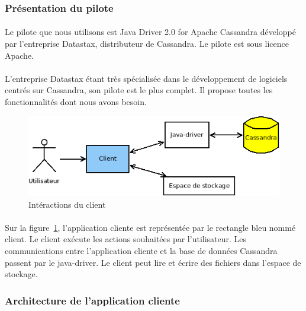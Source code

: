 \documentclass[12pt]{article}
\begin{document}
\subsubsection{Présentation du pilote}
\paragraph{} Le pilote que nous utilisons est Java Driver 2.0 for Apache Cassandra développé par l'entreprise Datastax, distributeur de Cassandra. Le pilote est sous licence Apache.

\paragraph{} L'entreprise Datastax étant très spécialisée dans le développement de logiciels centrés sur Cassandra, son pilote est le plus complet. Il propose
toutes les fonctionnalités dont nous avons besoin.

\begin{figure}[h]
	\centering
		\includegraphics[width=12cm]{images/client/acteurs.png}
	\caption{Intéractions du client \label{fig:client_acteurs}}
\end{figure}

\paragraph{} Sur la figure~\ref{fig:client_acteurs}, l'application cliente est représentée par le rectangle bleu nommé client.
Le client exécute les actions souhaitées par l'utilisateur. Les communications entre l'application cliente et la base de données Cassandra passent par le java-driver.
Le client peut lire et écrire des fichiers dans l'espace de stockage.

\subsubsection{Architecture de l'application cliente}
\end{document}
